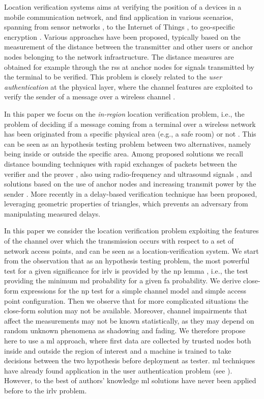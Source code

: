 \documentclass[twocolumns]{IEEEtran}
\begin{document}
Location verification systems aims at verifying the position of a devices in a mobile communication network, and find application in various scenarios, spanning from sensor networks \cite{Zeng-survey, 8376254}, to the Internet of Things \cite{7903611}, to geo-specific encryption \cite{quaglia}. Various approaches have been proposed, typically based on the measurement of the distance between the transmitter and other users  or  anchor nodes belonging to the network infrastructure. The distance measures are obtained for example through the \ac{rss} at anchor nodes for signals transmitted by the terminal to be verified.  This problem is closely related to the {\em user authentication} at the physical layer, where the channel features are exploited to verify the sender of a message over a wireless channel \cite{7270404}.

In this paper we focus on the {\em in-region} location verification problem, i.e., the problem of deciding if a message coming from a terminal over a wireless network has been originated from a specific physical area (e.g., a safe room) or not \cite{quaglia}. This can be seen as an hypothesis testing problem between two alternatives, namely being inside or outside the specific area. Among proposed solutions we recall distance bounding techniques with rapid exchanges of packets between the verifier and the prover \cite{Brands}, also using radio-frequency and ultrasound signals \cite{Sastry}, and solutions based on the use of anchor nodes and increasing transmit power by the sender \cite{Vora}. More recently in \cite{7145434} a delay-based verification technique has been proposed, leveraging geometric properties of triangles, which prevents an adversary from manipulating measured delays.  

In this paper we consider the location verification problem exploiting the features of the channel over which the transmission occurs with respect to a set of network access points, and can be seen as a location-verification system. We start from the observation that as an hypothesis testing problem, the most powerful test for a given significance for \ac{irlv} is provided by the \ac{np} lemma \cite{Neyman289}, i.e., the test providing the minimum \ac{md} probability for a given \ac{fa} probability. We derive close-form expressions for the \ac{np} test for a simple channel model and simple access point configuration. Then we observe that for more complicated situations the close-form solution may not be available. Moreover,  channel impairments that affect the measurements may not be known statistically, as they may depend on random unknown phenomena as shadowing and fading. We therefore propose here to use a \ac{ml} approach, where first data are collected by trusted nodes both inside and outside the region of interest and a machine is trained to take decisions between the two hypothesis before deployment as tester. \ac{ml} techniques have already found application in the user authentication problem (see  \cite{pei2014channel, tian2015robust,Wang-17, xiao-2018, }). However, to the best of authors' knowledge \ac{ml} solutions have never been applied before to the \ac{irlv} problem. 
\end{document}
